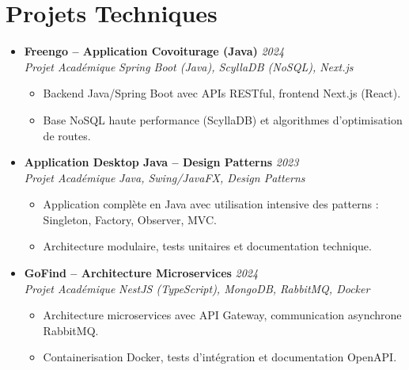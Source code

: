 \documentclass[a4paper,11pt]{article}
\begin{document}
\section{Projets Techniques}
\begin{itemize}[leftmargin=*, label={-}]

\item \textbf{Freengo -- Application Covoiturage (Java)} \hfill \textit{2024} \\
\textit{Projet Académique} \hfill \textit{Spring Boot (Java), ScyllaDB (NoSQL), Next.js}
\vspace{-2pt}
    \begin{itemize}[leftmargin=0.4cm, nosep, label=\tiny$\bullet$]
        \item \small{Backend Java/Spring Boot avec APIs RESTful, frontend Next.js (React).}
        \item \small{Base NoSQL haute performance (ScyllaDB) et algorithmes d'optimisation de routes.}
    \end{itemize}
\vspace{3pt}

\item \textbf{Application Desktop Java -- Design Patterns} \hfill \textit{2023} \\
\textit{Projet Académique} \hfill \textit{Java, Swing/JavaFX, Design Patterns}
\vspace{-2pt}
    \begin{itemize}[leftmargin=0.4cm, nosep, label=\tiny$\bullet$]
        \item \small{Application complète en Java avec utilisation intensive des patterns : Singleton, Factory, Observer, MVC.}
        \item \small{Architecture modulaire, tests unitaires et documentation technique.}
    \end{itemize}
\vspace{3pt}

\item \textbf{GoFind -- Architecture Microservices} \hfill \textit{2024} \\
\textit{Projet Académique} \hfill \textit{NestJS (TypeScript), MongoDB, RabbitMQ, Docker}
\vspace{-2pt}
    \begin{itemize}[leftmargin=0.4cm, nosep, label=\tiny$\bullet$]
        \item \small{Architecture microservices avec API Gateway, communication asynchrone RabbitMQ.}
        \item \small{Containerisation Docker, tests d'intégration et documentation OpenAPI.}
    \end{itemize}
\vspace{3pt}


\end{itemize}
\end{document}
